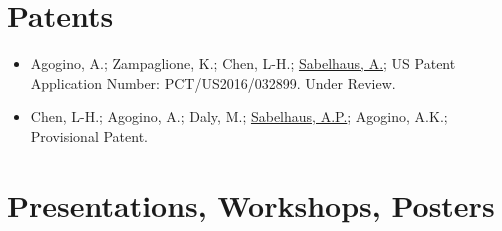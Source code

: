 \documentclass[letterpaper]{deedy-resume} %
\begin{document}

\section{Patents}

\vspace{0.2cm}

\begin{itemize}

\item {} Agogino, A.; Zampaglione, K.; Chen, L-H.; \underline{Sabelhaus, A.}; US Patent Application Number: PCT/US2016/032899. Under Review.

\item {} Chen, L-H.; Agogino, A.; Daly, M.; \underline{Sabelhaus, A.P.}; Agogino, A.K.; Provisional Patent.

\end{itemize}



\section{Presentations, Workshops, Posters}
\end{document}
